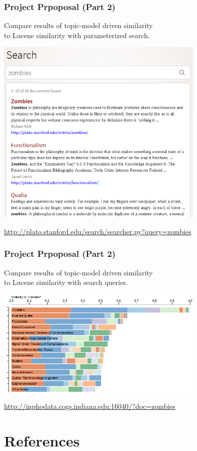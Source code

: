 \documentclass[t]{beamer}
\begin{document}
\begin{frame}
\frametitle{Project Prpoposal (Part 2)}
Compare results of topic-model driven similarity\\
to Lucene similarity with parameterized search.

\includegraphics[width=0.75\textwidth]{img/zombie-lucene.png}

\url{http://plato.stanford.edu/search/searcher.py?query=zombies}
\end{frame}

\begin{frame}
\frametitle{Project Prpoposal (Part 2)}
Compare results of topic-model driven similarity\\
to Lucene similarity with search queries.

\includegraphics[width=0.75\textwidth]{img/topex-zombies.png}

\url{http://inphodata.cogs.indiana.edu:16040/?doc=zombies}
\end{frame}

\section{References}
\begin{frame}
\tiny


\end{frame}

\frame{\titlepage}
\end{document}
